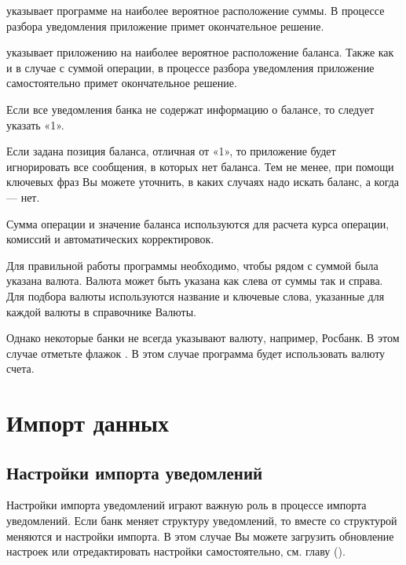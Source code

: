 \documentclass[a4paper,10pt,russian]{sphinxmanual}
\begin{document}
\sphinxAtStartPar
{} указывает программе на наиболее вероятное
расположение суммы. В процессе разбора уведомления приложение примет окончательное решение.

\sphinxAtStartPar
{} указывает приложению на наиболее вероятное
расположение баланса. Также как и в случае с суммой операции, в процессе разбора уведомления
приложение самостоятельно примет окончательное решение.

\sphinxAtStartPar
Если все уведомления банка не содержат информацию о балансе, то следует указать «\sphinxhyphen{}1».

\sphinxAtStartPar
Если задана позиция баланса, отличная от «\sphinxhyphen{}1», то приложение будет игнорировать все сообщения, в которых нет баланса.
Тем не менее, при помощи ключевых фраз Вы можете уточнить, в каких случаях надо искать баланс, а когда — нет.

\sphinxAtStartPar
Сумма операции и значение баланса используются для расчета курса операции, комиссий и автоматических корректировок.

\sphinxAtStartPar
Для правильной работы программы необходимо, чтобы рядом с суммой была указана валюта. Валюта может быть указана как
слева от суммы так и справа. Для подбора валюты используются название и ключевые слова, указанные для каждой валюты
в справочнике Валюты.

\sphinxAtStartPar
Однако некоторые банки не всегда указывают валюту, например, Росбанк. В этом случае отметьте флажок
. В этом случае программа будет использовать валюту счета.

\sphinxstepscope


\chapter{Импорт данных}
\label{\detokenize{import:chapter-import}}\label{\detokenize{import:id1}}\label{\detokenize{import::doc}}

\section{Настройки импорта уведомлений}
\label{\detokenize{import:id2}}
\sphinxAtStartPar
Настройки импорта уведомлений играют важную роль в процессе импорта уведомлений. Если банк меняет
структуру уведомлений, то вместе со структурой меняются и настройки импорта. В этом случае Вы можете
загрузить обновление настроек или отредактировать настройки самостоятельно, см. главу {\hyperref[\detokenize{notifications:chapter-notifications}]{}} ().
\end{document}
